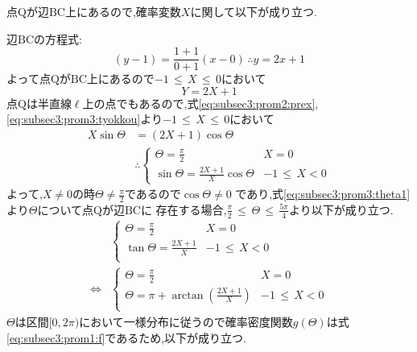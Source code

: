 \begin{enumerate}[(1)]
  点$\mathrm{Q}$が辺$\mathrm{BC}$上にあるので,確率変数$X$に関して以下が成り立つ.
    
  辺$\mathrm{BC}$の方程式:
  \begin{equation*}
    (y - 1) = \frac{1 + 1}{0 + 1}(x - 0)\, \therefore y = 2x + 1
  \end{equation*}
  よって点$\mathrm{Q}$が$\mathrm{BC}$上にあるので$-1\, \leq\, X\, \leq\, 0$において
  \begin{equation}
    Y = 2X + 1\label{eq:subsec3:prom3:tyokkou}
  \end{equation}
  点$\mathrm{Q}$は半直線$\ell$上の点でもあるので,式\eqref{eq:subsec3:prom2:prex}, \eqref{eq:subsec3:prom3:tyokkou}より$-1\, \leq\, X\, \leq\, 0$において
  \begin{align}
    X\sin\Theta &= \left(2X + 1\right)\cos\Theta\nonumber\\
                &\therefore
                  \begin{cases}
                    \Theta = \frac{\pi}{2} & X = 0\\
                    \sin\Theta = \frac{2X + 1}{X}\cos\Theta & -1\, \leq\, X < 0
                  \end{cases}\label{eq:subsec3:prom3:theta1}
  \end{align}
  よって,$X \neq 0$の時$\Theta \neq \frac{\pi}{2}$であるので$\cos\Theta \neq 0$
  であり,式\eqref{eq:subsec3:prom3:theta1}より$\Theta$について点$\mathrm{Q}$が辺$\mathrm{BC}$に
  存在する場合,$\frac{\pi}{2} \, \leq\, \Theta\, \leq\, \frac{5\pi}{4}$より以下が成り立つ.
  \begin{align}
    &\begin{cases}
      \Theta = \frac{\pi}{2} & X = 0\\
      \tan\Theta = \frac{2X + 1}{X} & -1\, \leq\, X < 0\\
    \end{cases}\nonumber\\
    \Longleftrightarrow&
                         \begin{cases}
                           \Theta = \frac{\pi}{2} & X = 0\\
                           \Theta = \pi + \arctan\left(\frac{2X + 1}{X}\right) & -1\, \leq\, X < 0\\
                         \end{cases}\label{eq:subsec3:prom3:theta2}
  \end{align}
  $\Theta$は区間$[0, 2\pi)$において一様分布に従うので確率密度関数$g(\Theta)$は式
  \eqref{eq:subsec3:prom1:f}であるため,以下が成り立つ.

\end{enumerate}
